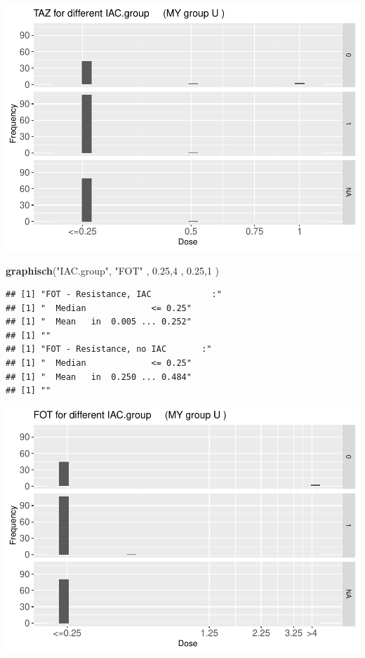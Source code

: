 \documentclass[
]{article}
\newenvironment{Shaded}{\begin{snugshade}}{\end{snugshade}}
\newcommand{\DecValTok}[1]{\textcolor[rgb]{0.00,0.00,0.81}{#1}}
\newcommand{\FloatTok}[1]{\textcolor[rgb]{0.00,0.00,0.81}{#1}}
\newcommand{\KeywordTok}[1]{\textcolor[rgb]{0.13,0.29,0.53}{\textbf{#1}}}
\newcommand{\NormalTok}[1]{#1}
\newcommand{\StringTok}[1]{\textcolor[rgb]{0.31,0.60,0.02}{#1}}
\begin{document}
\includegraphics{Verteilungen_files/figure-latex/unnamed-chunk-11-1.pdf}

\begin{Shaded}
\begin{Highlighting}[]
  \KeywordTok{graphisch}\NormalTok{(}\StringTok{"IAC.group"}\NormalTok{, }\StringTok{"FOT"}\NormalTok{ , }\FloatTok{0.25}\NormalTok{,}\DecValTok{4}\NormalTok{   ,   }\FloatTok{0.25}\NormalTok{,}\DecValTok{1}\NormalTok{     )  }
\end{Highlighting}
\end{Shaded}

\begin{verbatim}
## [1] "FOT - Resistance, IAC            :"
## [1] "  Median             <= 0.25"
## [1] "  Mean   in  0.005 ... 0.252"
## [1] ""
## [1] "FOT - Resistance, no IAC       :"
## [1] "  Median             <= 0.25"
## [1] "  Mean   in  0.250 ... 0.484"
## [1] ""
\end{verbatim}

\includegraphics{Verteilungen_files/figure-latex/unnamed-chunk-12-1.pdf}
\end{document}
